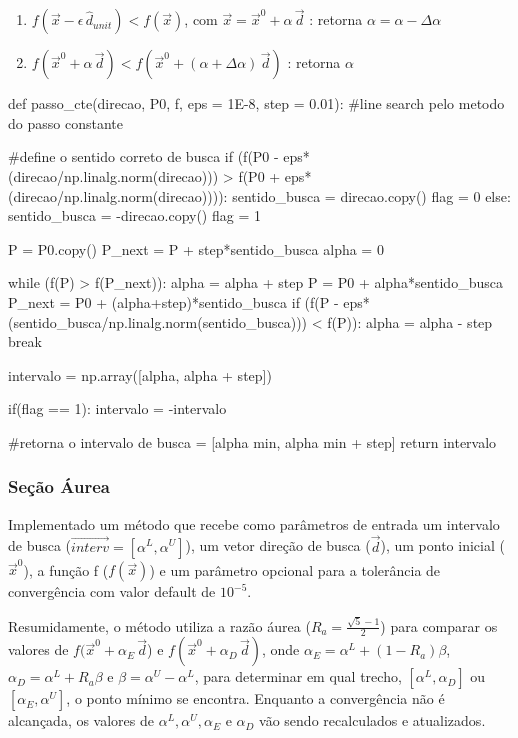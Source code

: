 \documentclass[10pt, a4paper]{article}
\begin{document}
\begin{enumerate}
  \item $f(\overrightarrow{x}-\epsilon\,\hat{d}_{unit}) < f(\overrightarrow{x})$,
  com $\overrightarrow{x} = \overrightarrow{x}^0 + \alpha\,\overrightarrow{d}$ : retorna $\alpha = \alpha - \Delta \alpha$
  \item $f(\overrightarrow{x}^0+ \alpha\,\overrightarrow{d}) < f(\overrightarrow{x}^0 +
  (\alpha + \Delta\alpha)\,\overrightarrow{d})$ : retorna $\alpha$  
\end{enumerate}


\begin{python}
  def passo_cte(direcao, P0, f, eps = 1E-8, step = 0.01):
    #line search pelo metodo do passo constante
      
    #define o sentido correto de busca
    if (f(P0 - eps*(direcao/np.linalg.norm(direcao))) > f(P0 + eps*(direcao/np.linalg.norm(direcao)))):
        sentido_busca = direcao.copy()
        flag = 0
    else:
        sentido_busca = -direcao.copy()
        flag = 1
        
    P = P0.copy()
    P_next = P + step*sentido_busca
    alpha = 0
   
    while (f(P) > f(P_next)):           
        alpha = alpha + step
        P = P0 + alpha*sentido_busca
        P_next = P0 + (alpha+step)*sentido_busca
        if (f(P - eps*(sentido_busca/np.linalg.norm(sentido_busca))) < f(P)):
            alpha = alpha - step
            break
    
    intervalo = np.array([alpha, alpha + step])
    
    if(flag == 1):
        intervalo = -intervalo
        
    #retorna o intervalo de busca = [alpha min, alpha min + step]                 
    return intervalo
\end{python}

\subsubsection{Seção Áurea}

Implementado um método que recebe como parâmetros de entrada um intervalo de busca
($\overrightarrow{interv} = [\alpha^L, \alpha^U]$), um vetor direção de busca ($\overrightarrow{d}$),
um ponto inicial ($\overrightarrow{x}^0$), a função f ($f(\overrightarrow{x})$) 
e um parâmetro opcional para a tolerância de convergência com valor default de $10^{-5}$.

Resumidamente, o método utiliza a razão áurea ($R_a = \frac{\sqrt{5} - 1}{2}$) para comparar os 
valores de $f(\overrightarrow{x}^0 + \alpha_{E}\,\overrightarrow{d}$) e
$f(\overrightarrow{x}^0 + \alpha_{D}\,\overrightarrow{d})$,
onde $\alpha_{E} = \alpha^L + (1 - R_a )\beta$, $\alpha_{D} = \alpha^L + R_a\beta$ e $\beta = \alpha^U - \alpha^L$, 
para determinar em qual trecho, $[\alpha^L, \alpha_{D}]$ ou $[\alpha_{E}, \alpha^U]$, o ponto mínimo se encontra. Enquanto a
convergência não é alcançada, os valores de $\alpha^L, \alpha^U, \alpha_E$ e $\alpha_D$ vão sendo recalculados e atualizados.
\end{document}
